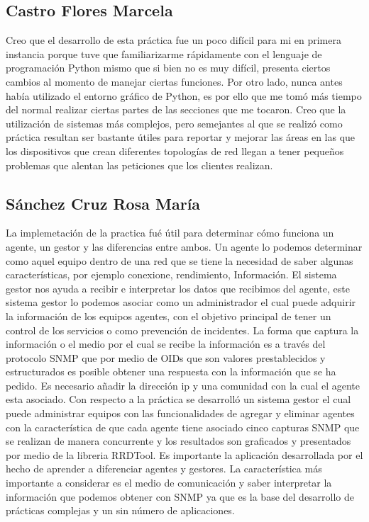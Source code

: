 \subsection{Castro Flores Marcela}
Creo que el desarrollo de esta práctica fue un poco difícil para mi en primera instancia porque tuve que familiarizarme rápidamente con el lenguaje de programación Python mismo que si bien no es muy difícil, presenta ciertos cambios al momento de manejar ciertas funciones. Por otro lado, nunca antes había utilizado el entorno gráfico de Python, es por ello que me tomó más tiempo del normal realizar ciertas partes de las secciones que me tocaron. 
Creo que la utilización de sistemas más complejos, pero semejantes al que se realizó como práctica resultan ser bastante útiles para reportar y mejorar las áreas en las que los dispositivos que crean diferentes topologías de red llegan a tener pequeños problemas que alentan las peticiones que los clientes realizan. 
\subsection{Sánchez Cruz Rosa María}
La implemetación de la practica fué útil para determinar cómo funciona un agente, un gestor y las diferencias entre ambos.
Un agente lo podemos determinar como aquel equipo dentro de una red que se tiene la necesidad de saber algunas características, por ejemplo conexione, rendimiento,  Información.
El sistema gestor nos ayuda a recibir e interpretar los datos que recibimos del agente, este sistema gestor lo podemos asociar como un administrador el cual puede adquirir la información de los equipos agentes, con el objetivo principal de tener un control de los servicios o como prevención de incidentes.
La forma que captura la información o el medio por el cual se recibe la información es a través del protocolo SNMP que por medio de OIDs que son valores prestablecidos y estructurados es posible obtener una respuesta con la información que se ha pedido. Es necesario añadir la dirección ip y una comunidad con la cual el agente esta asociado.
Con respecto a la práctica se desarrolló un sistema gestor el cual puede administrar equipos con las funcionalidades de agregar y eliminar agentes con la característica de que cada agente tiene asociado cinco capturas SNMP que se realizan de manera concurrente y los resultados son graficados y presentados por medio de la libreria RRDTool. Es importante la aplicación desarrollada por el hecho de aprender a diferenciar agentes y gestores. La característica más importante a considerar es el medio de comunicación y saber interpretar la información que podemos obtener con SNMP ya que es la base del desarrollo de prácticas complejas y un sin número de aplicaciones.


